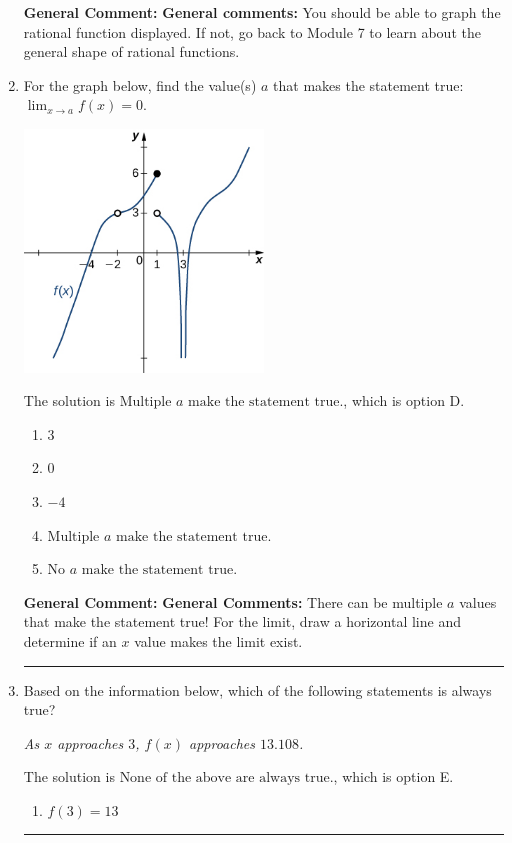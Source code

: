 \documentclass{extbook}[14pt]
\newcommand{\litem}[1]{\item #1

\rule{\textwidth}{0.4pt}}
\begin{document}
\begin{enumerate}
{\begin{enumerate}[label=\Alph*.]
\end{enumerate}

\textbf{General Comment:} \textbf{General comments:} You should be able to graph the rational function displayed. If not, go back to Module 7 to learn about the general shape of rational functions.
}
\litem{
For the graph below, find the value(s) $a$ that makes the statement true: $ \displaystyle \lim_{x \rightarrow a} f(x) = 0$.

\begin{center}
    \includegraphics[width=0.5\textwidth]{../Figures/evaluateLimitGraphicallyCopyC.png}
\end{center}


The solution is \( \text{Multiple } a \text{ make the statement true}. \), which is option D.\begin{enumerate}[label=\Alph*.]
\item \( 3 \)


\item \( 0 \)


\item \( -4 \)


\item \( \text{Multiple } a \text{ make the statement true}. \)


\item \( \text{No } a \text{ make the statement true}. \)


\end{enumerate}

\textbf{General Comment:} \textbf{General Comments:} There can be multiple $a$ values that make the statement true! For the limit, draw a horizontal line and determine if an $x$ value makes the limit exist.
}
\litem{
Based on the information below, which of the following statements is always true?

\begin{center}
    \textit{ As $x$ approaches $3$, $f(x)$ approaches $13.108$. }
\end{center}
The solution is \( \text{None of the above are always true.} \), which is option E.\begin{enumerate}[label=\Alph*.]
\item \( f(3) = 13 \)



\end{enumerate}}
\end{enumerate}
\end{document}
